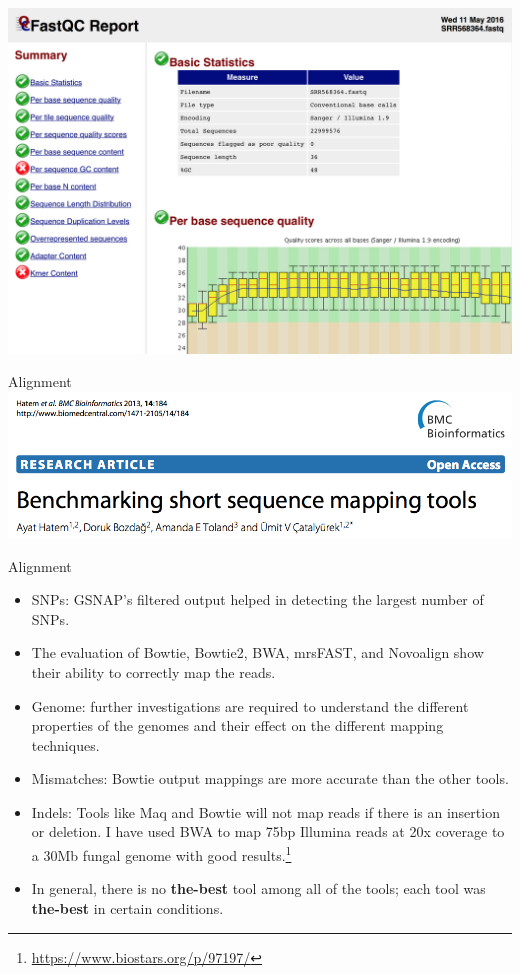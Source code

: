 \documentclass{beamer}
\begin{document}
\begin{frame}
\includegraphics[width=\linewidth]{fastqcrep.png}
\end{frame}


\begin{frame}{Alignment}
\includegraphics[width=\linewidth]{mappaper.png}
\end{frame}

\begin{frame}{Alignment}
\begin{itemize}
\item SNPs: GSNAP’s filtered output helped in detecting the largest number of SNPs.
\item The evaluation of Bowtie, Bowtie2, BWA, mrsFAST, and Novoalign show their ability to correctly map the reads.
\item Genome: further investigations are required to understand the different properties of the genomes and their effect on the different mapping techniques.
\item Mismatches: Bowtie output mappings are more accurate than the other tools.
\item Indels: Tools like Maq and Bowtie will not map reads if there is an insertion or deletion. I have used BWA to map 75bp Illumina reads at 20x coverage to a 30Mb fungal genome with good results.\footnote{\url{https://www.biostars.org/p/97197/}}
\item In general, there is no \textbf{the-best} tool among all of the tools; each tool was \textbf{the-best} in certain conditions.
\end{itemize}
\end{frame}
\end{document}
